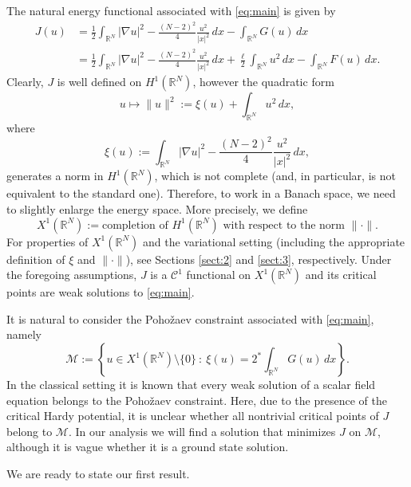 \documentclass[12pt,leqno,twoside,sort]{amsart}
\newcommand{\R}{\mathbb{R}}
\newcommand{\cC}{{\mathcal C}}
\newcommand{\cM}{{\mathcal M}}
\numberwithin{equation}{section}
\begin{document}
The natural energy functional associated with \eqref{eq:main} is given by
\begin{align*}
J (u) &= \frac{1}{2} \int_{\R^N} |\nabla u|^2 - \frac{(N-2)^2}{4} \frac{u^2}{|x|^2} \, dx - \int_{\R^N} G(u) \, dx \\
&=  \frac{1}{2} \int_{\R^N} |\nabla u|^2 - \frac{(N-2)^2}{4} \frac{u^2}{|x|^2} \, dx + \frac{\ell}{2} \int_{\R^N} u^2 \, dx - \int_{\R^N} F(u) \, dx.
\end{align*}
Clearly, $J$ is well defined on $H^1 (\R^N)$, however the quadratic form
$$
u \mapsto \|u\|^2 := \xi(u) +  \int_{\R^N} u^2 \, dx,
$$
where
$$
\xi(u) := \int_{\R^N} |\nabla u|^2 - \frac{(N-2)^2}{4} \frac{u^2}{|x|^2} \, dx,
$$
generates a norm in $H^1 (\R^N)$, which is not complete (and, in particular, is not equivalent to the standard one). Therefore, to work in a Banach space, we need to slightly enlarge the energy space. More precisely, we define
$$
X^1 (\R^N) := \mbox{completion of } H^1(\R^N) \mbox{ with respect to the norm } \| \cdot \|.
$$
For properties of $X^1 (\R^N)$ and the variational setting (including the appropriate definition of $\xi$ and $\|\cdot\|$), see Sections \ref{sect:2} and \ref{sect:3}, respectively. Under the foregoing assumptions, $J$ is a $\cC^1$ functional on $X^1(\R^N)$ and its critical points are weak solutions to \eqref{eq:main}.

It is natural to consider the Poho\v{z}aev constraint associated with \eqref{eq:main}, namely
$$
\cM := \left\{ u \in X^1 (\R^N) \setminus \{0\} \ : \ \xi(u) = 2^* \int_{\R^N} G(u) \, dx \right\}.
$$
In the classical setting it is known that every weak solution of a scalar field equation belongs to the Poho\v{z}aev constraint. Here, due to the presence of the critical Hardy potential, it is unclear whether all nontrivial critical points of $J$ belong to $\cM$. In our analysis we will find a solution that minimizes $J$ on $\cM$, although it is vague whether it is a ground state solution.

We are ready to state our first result.
\end{document}
